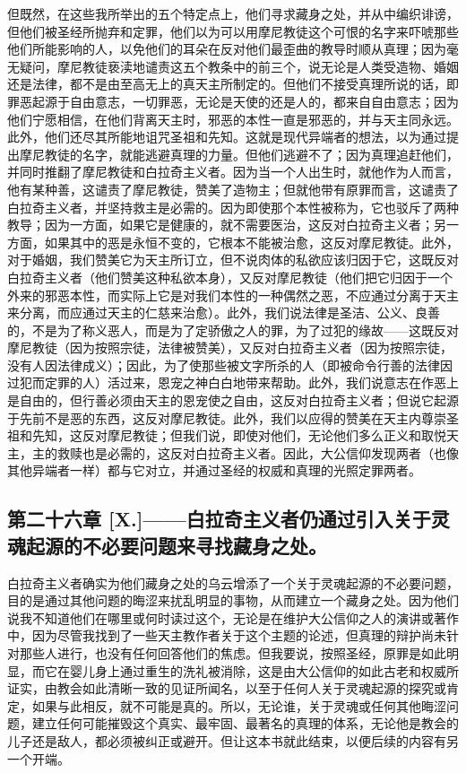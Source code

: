 但既然，在这些我所举出的五个特定点上，他们寻求藏身之处，并从中编织诽谤，但他们被圣经所抛弃和定罪，他们以为可以用摩尼教徒这个可恨的名字来吓唬那些他们所能影响的人，以免他们的耳朵在反对他们最歪曲的教导时顺从真理；因为毫无疑问，摩尼教徒亵渎地谴责这五个教条中的前三个，说无论是人类受造物、婚姻还是法律，都不是由至高无上的真天主所制定的。但他们不接受真理所说的话，即罪恶起源于自由意志，一切罪恶，无论是天使的还是人的，都来自自由意志；因为他们宁愿相信，在他们背离天主时，邪恶的本性一直是邪恶的，并与天主同永远。此外，他们还尽其所能地诅咒圣祖和先知。这就是现代异端者的想法，以为通过提出摩尼教徒的名字，就能逃避真理的力量。但他们逃避不了；因为真理追赶他们，并同时推翻了摩尼教徒和白拉奇主义者。因为当一个人出生时，就他作为人而言，他有某种善，这谴责了摩尼教徒，赞美了造物主；但就他带有原罪而言，这谴责了白拉奇主义者，并坚持救主是必需的。因为即使那个本性被称为，它也驳斥了两种教导；因为一方面，如果它是健康的，就不需要医治，这反对白拉奇主义者；另一方面，如果其中的恶是永恒不变的，它根本不能被治愈，这反对摩尼教徒。此外，对于婚姻，我们赞美它为天主所订立，但不说肉体的私欲应该归因于它，这既反对白拉奇主义者（他们赞美这种私欲本身），又反对摩尼教徒（他们把它归因于一个外来的邪恶本性，而实际上它是对我们本性的一种偶然之恶，不应通过分离于天主来分离，而应通过天主的仁慈来治愈）。此外，我们说法律是圣洁、公义、良善的，不是为了称义恶人，而是为了定骄傲之人的罪，为了过犯的缘故——这既反对摩尼教徒（因为按照宗徒，法律被赞美），又反对白拉奇主义者（因为按照宗徒，没有人因法律成义）；因此，为了使那些被文字所杀的人（即被命令行善的法律因过犯而定罪的人）活过来，恩宠之神白白地带来帮助。此外，我们说意志在作恶上是自由的，但行善必须由天主的恩宠使之自由，这反对白拉奇主义者；但说它起源于先前不是恶的东西，这反对摩尼教徒。此外，我们以应得的赞美在天主内尊崇圣祖和先知，这反对摩尼教徒；但我们说，即使对他们，无论他们多么正义和取悦天主，主的救赎也是必需的，这反对白拉奇主义者。因此，大公信仰发现两者（也像其他异端者一样）都与它对立，并通过圣经的权威和真理的光照定罪两者。\par


\subsection{第二十六章 [X.]——白拉奇主义者仍通过引入关于灵魂起源的不必要问题来寻找藏身之处。}

白拉奇主义者确实为他们藏身之处的乌云增添了一个关于灵魂起源的不必要问题，目的是通过其他问题的晦涩来扰乱明显的事物，从而建立一个藏身之处。因为他们说我不知道他们在哪里或何时读过这个，无论是在维护大公信仰之人的演讲或著作中，因为尽管我找到了一些天主教作者关于这个主题的论述，但真理的辩护尚未针对那些人进行，也没有任何回答他们的焦虑。但我要说，按照圣经，原罪是如此明显，而它在婴儿身上通过重生的洗礼被消除，这是由大公信仰的如此古老和权威所证实，由教会如此清晰一致的见证所闻名，以至于任何人关于灵魂起源的探究或肯定，如果与此相反，就不可能是真的。所以，无论谁，关于灵魂或任何其他晦涩问题，建立任何可能摧毁这个真实、最牢固、最著名的真理的体系，无论他是教会的儿子还是敌人，都必须被纠正或避开。但让这本书就此结束，以便后续的内容有另一个开端。\par

